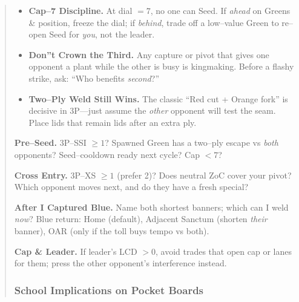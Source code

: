 \documentclass[11pt]{article}
\begin{document}
\begin{quote}
\begin{itemize}[leftmargin=1.3em,itemsep=0.35em]
  \item \textbf{Cap--7 Discipline.} At dial $=7$, no one can Seed. If \emph{ahead} on Greens \& position, freeze the dial; if \emph{behind}, trade off a low--value Green to re--open Seed for \emph{you}, not the leader.

  \item \textbf{Don''t Crown the Third.} Any capture or pivot that gives one opponent a plant while the other is busy is kingmaking. Before a flashy strike, ask: ``Who benefits \emph{second}?''

  \item \textbf{Two--Ply Weld Still Wins.} The classic ``Red cut + Orange fork'' is decisive in 3P---just assume the \emph{other} opponent will test the seam. Place lids that remain lids after an extra ply.

\end{itemize}

\medskip
\begin{tcolorbox}[enhanced,breakable,title={Triad Checklists (Say it before you move)},
  colback=white,colframe=royal,boxrule=0.8pt]
\small
\textbf{Pre--Seed.} 3P--SSI $\ge 1$? Spawned Green has a two--ply escape vs \emph{both} opponents? Seed--cooldown ready next cycle? Cap $<7$?

\textbf{Cross Entry.} 3P--XS $\ge 1$ (prefer 2)? Does neutral ZoC cover your pivot? Which opponent moves next, and do they have a fresh special?

\textbf{After I Captured Blue.} Name both shortest banners; which can I weld \emph{now}? Blue return: Home (default), Adjacent Sanctum (shorten \emph{their} banner), OAR (only if the toll buys tempo vs both).

\textbf{Cap \& Leader.} If leader's LCD $>0$, avoid trades that open cap or lanes for them; press the other opponent's interference instead.
\end{tcolorbox}

\subsubsection*{School Implications on Pocket Boards}
\label{sec:pocket-implications}

\begin{tcolorbox}[enhanced,breakable,title={4$\times$4 Pocket Diamond --- What Changes},
  colback=white,colframe=royal,boxrule=0.8pt]
\small
\begin{itemize}[leftmargin=1.1em,itemsep=0.3em]


\end{itemize}
\end{tcolorbox}
\end{quote}
\end{document}
